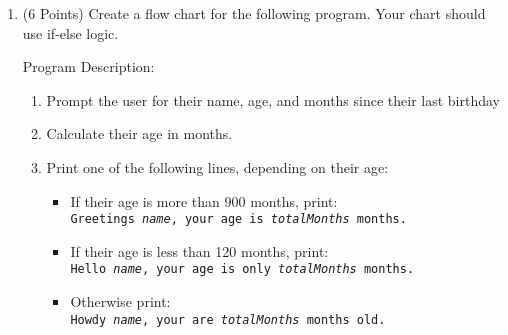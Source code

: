 \documentclass[11pt]{article}
\begin{document}



\begin{enumerate}
\item  (6 Points) Create a flow chart for the following program. Your chart should use if-else logic.

Program Description:
\begin{enumerate}
\item Prompt the user for their name, age, and months since their last birthday\item Calculate their age in months.
\item Print one of the following lines, depending on their age:
\begin{itemize}
\item If their age is more than 900 months, print:\\
\texttt{Greetings {\it name}, your age is {\it totalMonths} months.}
\item If their age is less than 120 months, print:\\
\texttt{Hello {\it name}, your age is only {\it totalMonths} months.}
\item Otherwise print:\\
\texttt{Howdy {\it name}, your are {\it totalMonths} months old.}
\end{itemize}
\end{enumerate}
\end{enumerate}
\end{document}
